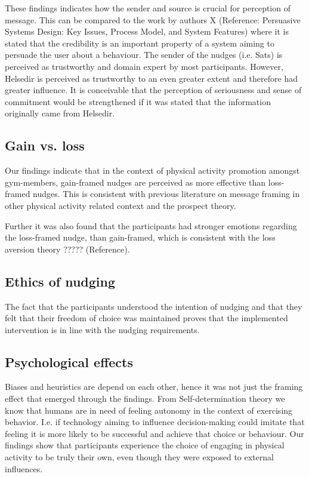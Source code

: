 These findings indicates how the sender and source is crucial for perception of message. This can be compared to the work by authors X (Reference: Persuasive Systems Design: Key Issues, Process Model, and System Features) where it is stated that the credibility is an important property of a system aiming to persuade the user about a behaviour. The sender of the nudges (i.e. Sats) is perceived as trustworthy and domain expert by most participants. However, Helsedir is perceived as trustworthy to an even greater extent and therefore had greater influence. It is conceivable that the perception of seriousness and sense of commitment would be strengthened if it was stated that the information originally came from Helsedir. 

\subsection{Gain vs. loss}
Our findings indicate that in the context of physical activity promotion amongst gym-members, gain-framed nudges are perceived as more effective than loss-framed nudges. This is consistent with previous literature on message framing in other physical activity related context and the prospect theory. 

Further it was also found that the participants had stronger emotions regarding the loss-framed nudge, than gain-framed, which is consistent with the loss aversion theory ????? (Reference). 

\subsection{Ethics of nudging}
The fact that the participants understood the intention of nudging and that they felt that their freedom of choice was maintained proves that the implemented intervention is in line with the nudging requirements.

\subsection{Psychological effects}
Biases and heuristics are depend on each other, hence it was not just the framing effect that emerged through the findings. From Self-determination theory we know that humans are in need of feeling autonomy in the context of exercising behavior. I.e. if technology aiming to influence decision-making could imitate that feeling it is more likely to be successful and achieve that choice or behaviour. Our findings show that participants experience the choice of engaging in physical activity to be truly their own, even though they were exposed to external influences. 

